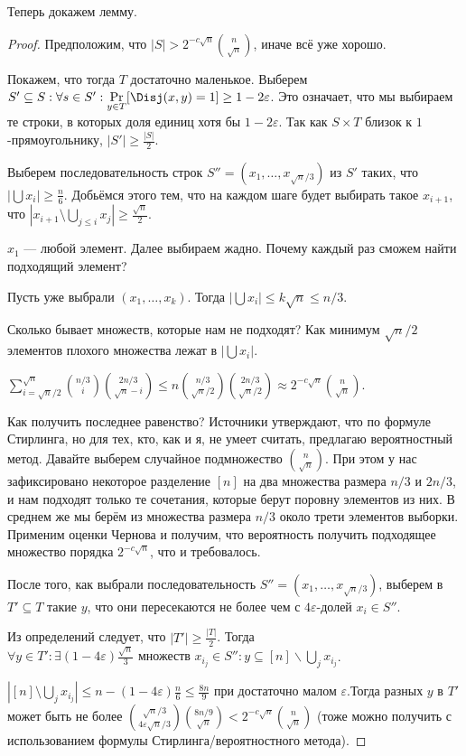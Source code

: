 Теперь докажем лемму.

\begin{proof}
    Предположим, что $|S| > 2^{-c\sqrt{n}} \binom{n}{\sqrt{n}}$, иначе всё уже хорошо.

    Покажем, что тогда $T$ достаточно маленькое. Выберем $S' \subseteq S : \forall s \in S' :
    \Pr\limits_{y \in  T}[\Disj(x, y) = 1] \geq 1 - 2\varepsilon$. Это означает, что мы выбираем те
    строки, в которых доля единиц хотя бы $1 - 2\varepsilon$. Так как $S \times T$ близок к
    $1$-прямоугольнику, $|S'| \ge \frac{|S|}{2}$.

    Выберем последовательность строк $S'' = (x_1, \ldots, x_{\sqrt{n}/3})$ из $S'$ таких, что $|\bigcup
    x_i| \geq \frac{n}{6}$. Добьёмся этого тем, что на каждом шаге будет выбирать такое $x_{i + 1}$, что
    $|x_{i + 1} \setminus \bigcup\limits_{j \leq i} x_j| \geq \frac{\sqrt{n}}{2}$.

    $x_1$ --- любой элемент. Далее выбираем жадно. Почему каждый раз сможем найти подходящий элемент?

    Пусть уже выбрали $(x_1, \dots, x_k)$. Тогда $|\bigcup x_i| \le k \sqrt{n} \leq n / 3$.

    Сколько бывает множеств, которые нам не подходят? Как минимум $\sqrt{n}/2$ элементов плохого
    множества лежат в $|\bigcup x_i|$.

    $\sum_{i = \sqrt{n}/2}^{\sqrt{n}}{{n/3}\choose{i}} {{2n/3}\choose{\sqrt{n} - i}} \leq n
    {{n/3}\choose{\sqrt{n}/2}} {{2n/3}\choose{\sqrt{n}/2}} \approx
    2^{-c\sqrt{n}}{{n}\choose{\sqrt{n}}}$.

    Как получить последнее равенство? Источники утверждают, что по формуле Стирлинга, но для тех, кто,
    как и я, не умеет считать, предлагаю вероятностный метод. Давайте выберем случайное подмножество
    ${{n}\choose{\sqrt{n}}}$. При этом у нас зафиксировано некоторое разделение $[n]$ на два множества
    размера $n/3$ и $2n/3$, и нам подходят только те сочетания, которые берут поровну элементов из них. В
    среднем же мы берём из множества размера $n/3$ около трети элементов выборки. Применим оценки Чернова
    и получим, что вероятность получить подходящее множество порядка $2^{-c\sqrt{n}}$, что и
    требовалось.

    После того, как выбрали последовательность $S'' = (x_1, \ldots, x_{\sqrt{n}/3})$, выберем в $T'
    \subseteq T$ такие $y$, что они пересекаются не более чем с $4\varepsilon$-долей $x_i \in S''$.

    Из определений следует, что $|T'| \geq \frac{|T|}{2}$. Тогда $\forall y \in T' :  \exists (1 -
    4\varepsilon) \frac{\sqrt{n}}{3} \text{ множеств } x_{i_j} \in S'' : y \subseteq [n] \backslash
    \bigcup_j x_{i_j}$.

    $|[n] \setminus \bigcup\limits_j x_{i_j}| \le n - (1 - 4\varepsilon)\frac{n}{6} \leq \frac{8n}{9}$
    при достаточно малом $\varepsilon$.Тогда разных $y$ в $T'$ может быть не более
    ${{\sqrt{n}/3}\choose{4\varepsilon\sqrt{n}/3}}{{8n/9}\choose{\sqrt{n}}} <
    2^{-c\sqrt{n}}{{n}\choose{\sqrt{n}}}$ (тоже можно получить с использованием формулы
    Стирлинга/вероятностного метода).
\end{proof}

